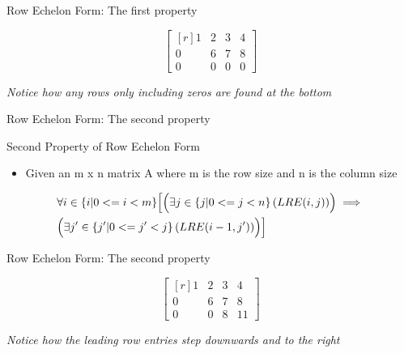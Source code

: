 \documentclass{beamer}
\begin{document}
\begin{frame}{Row Echelon Form: The first property}
  \begin{example}
    \begin{equation}
      \begin{bmatrix*}[r]
        1 & 2 & 3 & 4 \\
        0 & 6 & 7 & 8 \\
        0 & 0 & 0 & 0
      \end{bmatrix*}
    \end{equation}

    \textit{Notice how any rows only including zeros are found at the bottom}
  \end{example}
\end{frame}

\begin{frame}{Row Echelon Form: The second property}
  \begin{block}{Second Property of Row Echelon Form}
    \begin{itemize}
    \item Given an m x n matrix A where m is the row size and n is the column size
    \end{itemize}
    \begin{equation}
      \begin{split}
        &\forall i \in \{i | 0 <= i < m \} \Bigl[ \Bigl( \exists j \in \{j | 0 <= j < n \} \left( LRE(i, j) \right) \Bigr) \implies \Bigr. \\
        &\Bigl. \Bigl(\exists j^{\prime} \in \{ j^{\prime} | 0 <= j^{\prime} < j \} \left( LRE(i - 1, j^{\prime}) \right) \Bigr) \Bigr]
      \end{split}
    \end{equation}
  \end{block}
\end{frame}

\begin{frame}{Row Echelon Form: The second property}
  \begin{example}
    \begin{equation}
      \begin{bmatrix*}[r]
        1 & 2 & 3 & 4 \\
        0 & 6 & 7 & 8 \\
        0 & 0 & 8 & 11
      \end{bmatrix*}
    \end{equation}

    \textit{Notice how the leading row entries step downwards and to the right}
  \end{example}
\end{frame}
\end{document}
